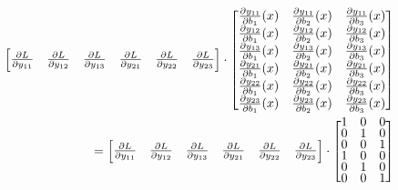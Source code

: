 \documentclass{article}
\begin{document}
\begin{align*}
        \begin{bmatrix}
            \frac{\partial L}{\partial y_{11}} & \frac{\partial L}{\partial y_{12}} & 
            \frac{\partial L}{\partial y_{13}} & \frac{\partial L}{\partial y_{21}} & 
            \frac{\partial L}{\partial y_{22}} & \frac{\partial L}{\partial y_{23}}
        \end{bmatrix} \cdot
        \renewcommand{\arraystretch}{0.7}
        \begin{bmatrix}
            \frac{\partial y_{11}}{\partial b_{1}}(x) & \frac{\partial y_{11}}{\partial b_{2}}(x) &
            \frac{\partial y_{11}}{\partial b_{3}}(x) \\
            \frac{\partial y_{12}}{\partial b_{1}}(x) & \frac{\partial y_{12}}{\partial b_{2}}(x) &
            \frac{\partial y_{12}}{\partial b_{3}}(x) \\
            \frac{\partial y_{13}}{\partial b_{1}}(x) & \frac{\partial y_{13}}{\partial b_{2}}(x) &
            \frac{\partial y_{13}}{\partial b_{3}}(x) \\
            \frac{\partial y_{21}}{\partial b_{1}}(x) & \frac{\partial y_{21}}{\partial b_{2}}(x) &
            \frac{\partial y_{21}}{\partial b_{3}}(x) \\
            \frac{\partial y_{22}}{\partial b_{1}}(x) & \frac{\partial y_{22}}{\partial b_{2}}(x) &
            \frac{\partial y_{22}}{\partial b_{3}}(x) \\
            \frac{\partial y_{23}}{\partial b_{1}}(x) & \frac{\partial y_{23}}{\partial b_{2}}(x) &
            \frac{\partial y_{23}}{\partial b_{3}}(x)
        \end{bmatrix} \\ =
        \begin{bmatrix}
            \frac{\partial L}{\partial y_{11}} & \frac{\partial L}{\partial y_{12}} & 
            \frac{\partial L}{\partial y_{13}} & \frac{\partial L}{\partial y_{21}} & 
            \frac{\partial L}{\partial y_{22}} & \frac{\partial L}{\partial y_{23}}
        \end{bmatrix} \cdot
        \begin{bmatrix}
            1 & 0 & 0 \\
            0 & 1 & 0 \\
            0 & 0 & 1 \\
            1 & 0 & 0 \\
            0 & 1 & 0 \\
            0 & 0 & 1
        \end{bmatrix}
\end{align*}
\end{document}
